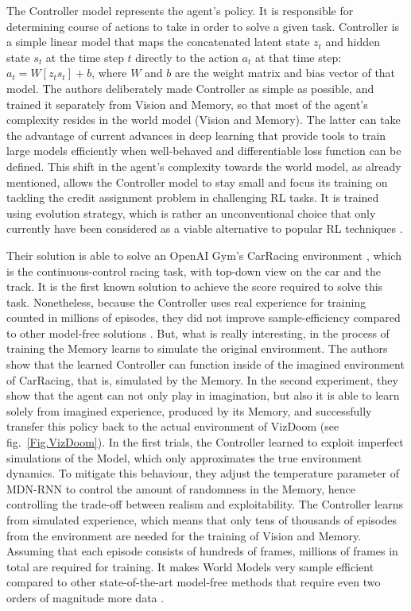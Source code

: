 The Controller model represents the agent's policy. It is responsible for determining course of actions to take in order to solve a given task. Controller is a simple linear model that maps the concatenated latent state $z_t$ and hidden state $s_t$ at the time step $t$ directly to the action $a_t$ at that time step: $a_t = W[z_t s_t] + b$, where $W$ and $b$ are the weight matrix and bias vector of that model.
The authors deliberately made Controller as simple as possible, and trained it separately from Vision and Memory, so that most of the agent's complexity resides in the world model (Vision and Memory). The latter can take the advantage of current advances in deep learning that provide tools to train large models efficiently when well-behaved and differentiable loss function can be defined.
This shift in the agent's complexity towards the world model, as already mentioned, allows the Controller model to stay small and focus its training on tackling the credit assignment problem in challenging RL tasks. It is trained using evolution strategy, which is rather an unconventional choice that only currently have been considered as a viable alternative to popular RL techniques \cite{Algo.ESRL}.

Their solution is able to solve an OpenAI Gym's CarRacing environment \cite{Code.OpenAIGym}, which is the continuous-control racing task, with top-down view on the car and the track. It is the first known solution to achieve the score required to solve this task. Nonetheless, because the Controller uses real experience for training counted in millions of episodes, they did not improve sample-efficiency compared to other model-free solutions \cite{Algo.CarRacingA3C}. But, what is really interesting, in the process of training the Memory learns to simulate the original environment. The authors show that the learned Controller can function inside of the imagined environment of CarRacing, that is, simulated by the Memory.
In the second experiment, they show that the agent can not only play in imagination, but also it is able to learn solely from imagined experience, produced by its Memory, and successfully transfer this policy back to the actual environment of VizDoom (see fig.~\ref{Fig.VizDoom}). In the first trials, the Controller learned to exploit imperfect simulations of the Model, which only approximates the true environment dynamics. To mitigate this behaviour, they adjust the temperature parameter of MDN-RNN to control the amount of randomness in the Memory, hence controlling the trade-off between realism and exploitability.
The Controller learns from simulated experience, which means that only tens of thousands of episodes from the environment are needed for the training of Vision and Memory. Assuming that each episode consists of hundreds of frames, millions of frames in total are required for training. It makes World Models very sample efficient compared to other state-of-the-art model-free methods that require even two orders of magnitude more data \cite{Algo.A3C}.

